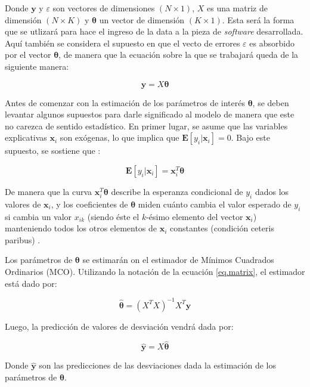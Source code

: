 Donde $\bm{y}$ y $\varepsilon$ son vectores de dimensiones $(N\times1)$, $X$ es una matriz de dimensión $(N\times K)$ y $\bm{\theta}$ un vector de dimensión $(K\times1)$. Esta será la forma que se utlizará para hace el ingreso de la data a la pieza de \emph{software} desarrollada. Aquí también se considera el supuesto en que el vecto de errores $\varepsilon$ es absorbido por el vector $\bm{\theta}$, de manera que la ecuación sobre la que se trabajará queda de la siguiente manera:

\begin{equation}
    \label{eq:matricial-final}
    \bm{y} = X\bm{\theta}
\end{equation}

Antes de comenzar con la estimación de los parámetros de interés $\bm{\theta}$, se deben levantar algunos supuestos para darle significado al modelo de manera que este no carezca de sentido estadístico. En primer lugar, se asume que las variables explicativas $\bm{x}_i$ son exógenas, lo que implica que $\bm{E}[y_i|\bm{x}_i]=0$. Bajo este supuesto, se sostiene que :

\begin{equation}
    \label{eq.e-xb}
    \bm{E}[y_i|\bm{x}_i] = \bm{x}_i^T\bm{\theta}
\end{equation}

De manera que la curva $\bm{x}_i^T\bm{\theta}$ describe la esperanza condicional de $y_i$ dados los valores de $\bm{x}_i$, y los coeficientes de $\bm{\theta}$ miden cuánto cambia el valor esperado de $y_i$ si cambia un valor $x_{ik}$ (siendo éste el $k$-ésimo elemento del vector $\bm{x}_i$) manteniendo todos los otros elementos de $\bm{x}_i$ constantes (condición ceteris paribus) \cite{verbeek}.

Los parámetros de $\bm{\theta}$ se estimarán on el estimador de Mínimos Cuadrados Ordinarios (MCO). Utilizando la notación de la ecuación \eqref{eq.matrix}, el estimador está dado por:

\begin{equation}
    \label{eq.mco}
    \bm{\hat\theta} = \left( X^TX\right)^{-1}X^T\bm{y}
\end{equation}

Luego, la predicción de valores de desviación vendrá dada por:

\begin{equation}
    \label{eq.predicc}
    \hat{\bm{y}} = X\hat{\bm{\theta}}
\end{equation}

Donde $\hat{\bm{y}}$ son las predicciones de las desviaciones dada la estimación de los parámetros de $\bm{\theta}$.  


